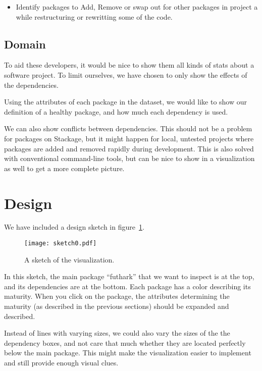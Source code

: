 \documentclass[a4paper,12pt]{article}
\begin{document}
\begin{itemize}
\item Identify packages to Add, Remove or swap out for other packages in project a while restructuring or rewritting some of the code.
\end{itemize}

\subsection{Domain}

To aid these developers, it would be nice to show them all kinds of stats about
a software project.  To limit ourselves, we have chosen to only show the effects
of the dependencies.

Using the attributes of each package in the dataset, we would like to show our
definition of a healthy package, and how much each dependency is used.

We can also show conflicts between dependencies.  This should not be a problem
for packages on Stackage, but it might happen for local, untested projects where
packages are added and removed rapidly during development.  This is also solved
with conventional command-line tools, but can be nice to show in a visualization
as well to get a more complete picture.


\section{Design}

We have included a design sketch in figure~\ref{fig:sketch0}.

\begin{figure}[h!]
\begin{center}
\texttt{[image: sketch0.pdf]}
\caption{A sketch of the visualization.}
\label{fig:sketch0}
\end{center}
\end{figure}

In this sketch, the main package ``futhark'' that we want to inspect is at the
top, and its dependencies are at the bottom.  Each package has a color
describing its maturity.  When you click on the package, the attributes
determining the maturity (as described in the previous sections) should be
expanded and described.

Instead of lines with varying sizes, we could also vary the sizes of the the
dependency boxes, and not care that much whether they are located perfectly
below the main package.  This might make the visualization easier to implement
and still provide enough visual clues.
\end{document}

